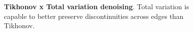 \begin{figure}
{}%
%
%
\caption{\textbf{Tikhonov x Total variation denoising}. Total variation is capable to better preserve discontinuities across edges than Tikhonov. }
\label{ch1:fig:denoising-results}
\end{figure}


